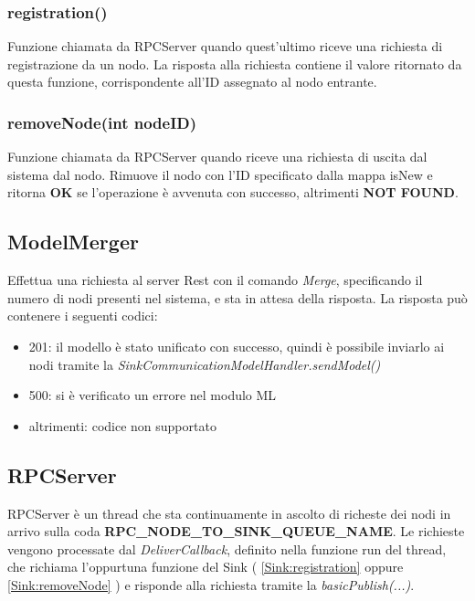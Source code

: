       \subsubsection{registration()}
        Funzione chiamata da RPCServer quando quest'ultimo riceve una richiesta di registrazione da un nodo. La risposta alla richiesta contiene il valore ritornato da questa funzione, corrispondente all'ID assegnato al nodo entrante.
        

      \subsubsection{removeNode(int nodeID)}
        Funzione chiamata da RPCServer quando riceve una richiesta di uscita dal sistema dal nodo. Rimuove il nodo con l'ID specificato dalla mappa isNew e ritorna \textbf{OK} se l'operazione è avvenuta con successo, altrimenti \textbf{NOT FOUND}.
        

    \subsection{ModelMerger}\label{ModelMerger}
      Effettua una richiesta al server Rest con il comando \textit{Merge}, specificando il numero di nodi presenti nel sistema, e sta in attesa della risposta. La risposta può contenere i seguenti codici:
      \begin{itemize}
        \item 201: il modello è stato unificato con successo, quindi è possibile inviarlo ai nodi tramite la \textit{SinkCommunicationModelHandler.sendModel()}
        \item 500: si è verificato un errore nel modulo ML
        \item altrimenti: codice non supportato
      \end{itemize}
      

    \subsection{RPCServer}\label{RPCServer}
      RPCServer è un thread che sta continuamente in ascolto di richeste dei nodi in arrivo sulla coda \textbf{RPC\_NODE\_TO\_SINK\_QUEUE\_NAME}. Le richieste vengono processate dal \textit{DeliverCallback}, definito nella funzione run del thread, che richiama l'oppurtuna funzione del Sink ( \ref{Sink:registration} oppure \ref{Sink:removeNode} ) e risponde alla richiesta tramite la \textit{basicPublish(...)}.
      

